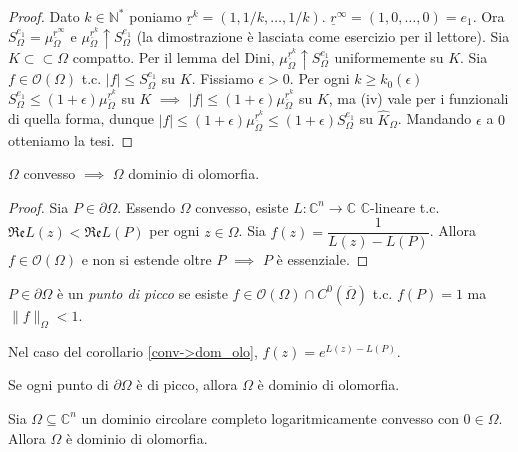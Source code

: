 \begin{proof}
  Dato $k \in \mathbb{N}^*$ poniamo $\underline{r}^k=(1,1/k,\dots,1/k)$. $\underline{r}^\infty=(1,0,\dots,0)=e_1$. Ora $S^{e_1}_\Omega=\mu_\Omega^{\underline{r}^\infty}$ e $\mu_\Omega^{\underline{r}^k} \uparrow S_\Omega^{e_1}$ (la dimostrazione è lasciata come esercizio per il lettore).
  Sia $K \subset\subset \Omega$ compatto. Per il lemma del Dini, $\mu_\Omega^{\underline{r}^k} \uparrow S_\Omega^{e_1}$ uniformemente su $K$. Sia $f \in \mathcal{O}(\Omega)$ t.c. $|f| \le S_\Omega^{e_1}$ su $K$.
  Fissiamo $\epsilon>0$. Per ogni $k \ge k_0(\epsilon)$ $S_\Omega^{e_1} \le (1+\epsilon)\mu_\Omega^{\underline{r}^k}$ su $K$ $\implies$ $|f| \le (1+\epsilon)\mu_\Omega^{\underline{r}^k}$ su $K$, ma (iv) vale per i funzionali di quella forma, dunque $|f| \le (1+\epsilon)\mu_\Omega^{\underline{r}^k} \le (1+\epsilon)S_\Omega^{e_1}$ su $\hat{K}_\Omega$. Mandando $\epsilon$ a $0$ otteniamo la tesi.
\end{proof}

\begin{cor} \label{conv->dom_olo}
  $\Omega$ convesso $\implies$ $\Omega$ dominio di olomorfia.
\end{cor}

\begin{proof}
  Sia $P \in \partial \Omega$. Essendo $\Omega$ convesso, esiste $L: \mathbb{C}^n \longrightarrow \mathbb{C}$ $\mathbb{C}$-lineare t.c. $\mathfrak{Re}L(z) < \mathfrak{Re}L(P)$ per ogni $z \in \Omega$. Sia $f(z)=\dfrac{1}{L(z)-L(P)}$. Allora $f \in \mathcal{O}(\Omega)$ e non si estende oltre $P$ $\implies$ $P$ è essenziale.
\end{proof}

\begin{defn}
  $P \in \partial\Omega$ è un \textit{punto di picco} se esiste $f \in \mathcal{O}(\Omega) \cap C^0(\overline{\Omega})$ t.c. $f(P)=1$ ma $\|f\|_\Omega<1$.
\end{defn}

\begin{ex}
  Nel caso del corollario \ref{conv->dom_olo}, $f(z)=e^{L(z)-L(P)}$.
\end{ex}

\begin{exc}
  Se ogni punto di $\partial\Omega$ è di picco, allora $\Omega$ è dominio di olomorfia.
\end{exc}

\begin{prop} \label{cclc->do}
  Sia $\Omega \subseteq \mathbb{C}^n$ un dominio circolare completo logaritmicamente convesso con $0 \in \Omega$. Allora $\Omega$ è dominio di olomorfia.
\end{prop}

